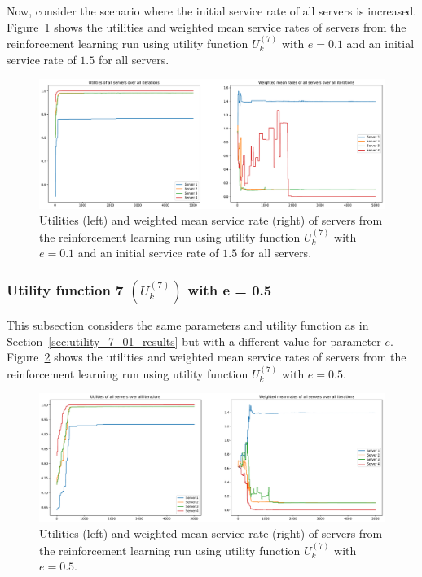 Now, consider the scenario where the initial service rate of all servers is
increased.
Figure~\ref{fig:RL_utility7_4_e01_initial_15} shows the utilities and weighted
mean service rates of servers from the reinforcement learning run using utility
function \(U_k^{(7)}\) with \(e = 0.1\) and an initial service rate of
\(1.5\) for all servers.

\begin{figure}[H]
    \includegraphics[width=\textwidth]{chapters/06_agent_based_extension/Bin/reinforcement_learning_results/utility_7/u7_4_e01_initial_15.pdf}
    \caption{Utilities (left) and weighted mean service rate (right) of servers
    from the reinforcement learning run using utility function \(U_k^{(7)}\)
    with \(e = 0.1\) and an initial service rate of \(1.5\) for all servers.}
    \label{fig:RL_utility7_4_e01_initial_15}
\end{figure}





\subsubsection{Utility function 7 \((U_k^{(7)})\) with e = 0.5}
\label{sec:utility_7_05_results}

This subsection considers the same parameters and utility function as in
Section~\ref{sec:utility_7_01_results} but with a different value for
parameter \(e\).
Figure~\ref{fig:RL_utility7_4_e05} shows the utilities and weighted mean
service rates of servers from the reinforcement learning run using utility
function \(U_k^{(7)}\) with \(e = 0.5\).

\begin{figure}[H]
    \includegraphics[width=\textwidth]{chapters/06_agent_based_extension/Bin/reinforcement_learning_results/utility_7/u7_4_e05.pdf}
    \caption{Utilities (left) and weighted mean service rate (right) of servers
    from the reinforcement learning run using utility function \(U_k^{(7)}\)
    with \(e = 0.5\).}
    \label{fig:RL_utility7_4_e05}
\end{figure}

